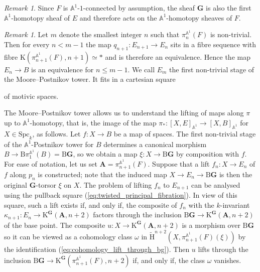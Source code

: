 \documentclass[11pt,leqno]{amsart}
\renewcommand{\1}{{\rm 1\hspace*{-0.4ex}%
\rule{0.1ex}{1.52ex}\hspace*{0.2ex}}}
\newcommand{\Spc}{\mathrm{Spc}}
\newcommand{\Hr}{{\mathrm {H}}}
\newcommand{\<}[1]{{\langle}#1 {\rangle}}
\newcommand{\Kr}{\mathrm{K}}
\newcommand{\Abf}{\mathbf{A}}
\newcommand{\Abb}{\mathbb{A}}
\newcommand{\Gbf}{\mathbf{G}}
\newcommand{\Br}{\mathrm{B}}
\theoremstyle{plain}
\theoremstyle{definition}
\theoremstyle{remark}
\newtheorem{rem}[thm]{Remark}
\numberwithin{equation}{section}
\begin{document}
\begin{rem}
Since $F$ is $\Abb^1$-$1$-connected by assumption, the sheaf $\Gbf$ is also the first $\Abb^1$-homotopy sheaf of $E$ and therefore acts on the $\Abb^1$-homotopy sheaves of $F$.
\end{rem}

\begin{rem}\label{rem:first_nontrivial_stage}
Let $m$ denote the smallest integer $n$ such that $\pi_n^{\Abb^1}(F)$ is non-trivial. Then for every $n<m-1$ the map $q_{n+1}:E_{n+1}\rightarrow E_n$ sits in a fibre sequence with fibre $\Kr(\pi_{n+1}^{\Abb^1}(F),n+1)\simeq *$ and is therefore an equivalence. Hence the map $E_n\rightarrow B$ is an equivalence for $n\leq m-1$. We call $E_{m}$ the first non-trivial stage of the Moore--Postnikov tower. It fits in a cartesian square
\begin{center}
\end{center}
of motivic spaces.
\end{rem}

The Moore--Postnikov tower allows us to understand the lifting of maps along $\pi$ up to $\Abb^1$-homotopy, that is, the image of the map $\pi_*:[X,E]_{\Abb^1}\to[X,B]_{\Abb^1}$ for $X\in\Spc_k$, as follows. Let $f:X\to B$ be a map of spaces. The first non-trivial stage of the $\Abb^1$-Postnikov tower for $B$ determines a canonical morphism $B\to\Br\pi_1^{\Abb^1}(B)=\Br\Gbf$, so we obtain a map $\xi:X\to\Br\Gbf$ by composition with $f$. For ease of notation, let us set $\Abf=\pi_{n+1}^{\Abb^1}(F)$. Suppose that a lift $f_n:X\to E_n$ of $f$ along $p_{n}$ is constructed; note that the induced map $X\to E_n\to\Br\Gbf$ is then the original $\Gbf$-torsor $\xi$ on $X$. The problem of lifting $f_n$ to $E_{n+1}$ can be analysed using the pullback square (\ref{eq:twisted_principal_fibration}). In view of this square, such a lift exists if, and only if, the composite of $f_n$ with the $k$-invariant $\kappa_{n+1}:E_n\to\Kr^\Gbf(\Abf,n+2)$ factors through the inclusion $\Br\Gbf\to\Kr^\Gbf(\Abf,n+2)$ of the base point. The composite $u:X\to\Kr^\Gbf(\Abf,n+2)$ is a morphism over $\Br\Gbf$ so it can be viewed as a cohomology class $\omega$ in $\widetilde{\Hr}^{n+2}(X,\pi_{n+1}^{\Abb^1}(F)(\xi))$ by the identification (\ref{eq:cohomology_lift_through_bg}). Then $u$ lifts through the inclusion $\Br\Gbf\to\Kr^\Gbf(\pi_{n+1}^{\Abb^1}(F),n+2)$ if, and only if, the class $\omega$ vanishes.
\end{document}
